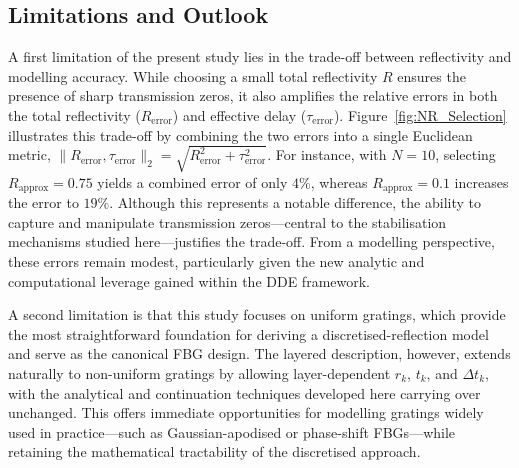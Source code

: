 \subsection{Limitations and Outlook}
\label{subsec:outlook}
%
A first limitation of the present study lies in the trade-off between reflectivity and modelling accuracy. 
While choosing a small total reflectivity $R$ ensures the presence of sharp transmission zeros, it also amplifies the relative errors in both the total reflectivity ($R_\text{error}$) and effective delay ($\tau_\text{error}$). 
Figure~\ref{fig:NR_Selection} illustrates this trade-off by combining the two errors into a single Euclidean metric, 
$\| R_\text{error}, \tau_\text{error} \|_{2} = \sqrt{R_\text{error}^2 + \tau_\text{error}^2}$. 
For instance, with $N=10$, selecting $R_\text{approx}=0.75$ yields a combined error of only $4\%$, whereas $R_\text{approx}=0.1$ increases the error to $19\%$. 
Although this represents a notable difference, the ability to capture and manipulate transmission zeros—central to the stabilisation mechanisms studied here—justifies the trade-off. 
From a modelling perspective, these errors remain modest, particularly given the new analytic and computational leverage gained within the DDE framework.
%
\par
%
A second limitation is that this study focuses on uniform gratings, which provide the most straightforward foundation for deriving a discretised-reflection model and serve as the canonical FBG design. 
The layered description, however, extends naturally to non-uniform gratings by allowing layer-dependent $r_k$, $t_k$, and $\Delta t_k$, with the analytical and continuation techniques developed here carrying over unchanged. 
This offers immediate opportunities for modelling gratings widely used in practice—such as Gaussian-apodised or phase-shift FBGs—while retaining the mathematical tractability of the discretised approach. 
%
\par
%
